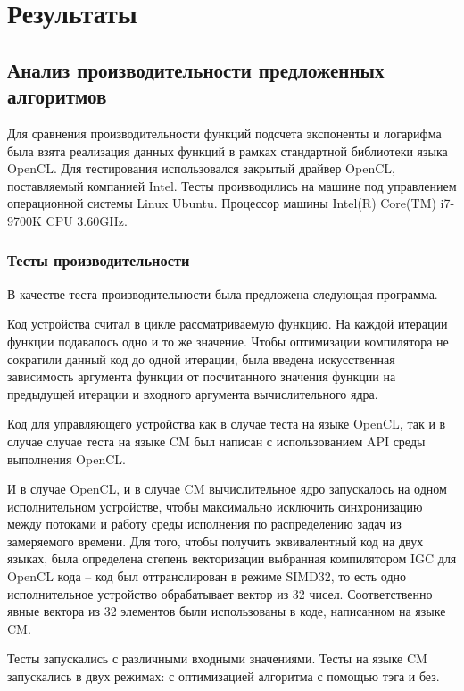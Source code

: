 \chapter{Результаты}

\section{Анализ производительности предложенных алгоритмов}

Для сравнения производительности функций подсчета экспоненты и логарифма была взята реализация данных функций в рамках стандартной библиотеки языка OpenCL.
Для тестирования использовался закрытый драйвер OpenCL, поставляемый компанией Intel.
Тесты производились на машине под управлением операционной системы Linux Ubuntu.
Процессор машины Intel(R) Core(TM) i7-9700K CPU 3.60GHz.

\subsection{Тесты производительности}

В качестве теста производительности была предложена следующая программа.

Код устройства считал в цикле рассматриваемую функцию.
На каждой итерации функции подавалось одно и то же значение.
Чтобы оптимизации компилятора не сократили данный код до одной итерации, была введена искусственная зависимость аргумента функции от посчитанного значения функции на предыдущей итерации и входного аргумента вычислительного ядра.

Код для управляющего устройства как в случае теста на языке OpenCL, так и в случае случае теста на языке CM был написан с использованием API среды выполнения OpenCL.

И в случае OpenCL, и в случае CM вычислительное ядро запускалось на одном исполнительном устройстве, чтобы максимально исключить синхронизацию между потоками и работу среды исполнения по распределению задач из замеряемого времени.
Для того, чтобы получить эквивалентный код на двух языках, была определена степень векторизации выбранная компилятором IGC для OpenCL кода -- код был оттранслирован в режиме SIMD32, то есть одно исполнительное устройство обрабатывает вектор из 32 чисел.
Соответственно явные вектора из 32 элементов были использованы в коде, написанном на языке CM.

Тесты запускались с различными входными значениями.
Тесты на языке CM запускались в двух режимах: с оптимизацией алгоритма с помощью тэга и без.

